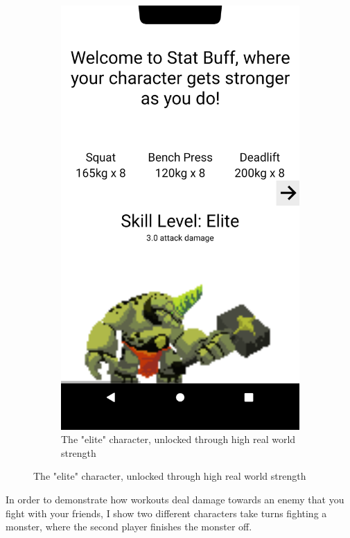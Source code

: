 \documentclass{l4proj}
\begin{document}
\begin{figure}[H]
\begin{subfigure}{0.45\textwidth}
        \includegraphics[width=\textwidth]{elite.png}
        \caption{The "elite" character, unlocked through high real world strength} 
    \end{subfigure}
\end{figure}

In order to demonstrate how workouts deal damage towards an enemy that you fight with your friends, I show two different characters take turns fighting a monster, where the second player finishes the monster off.
\end{document}
